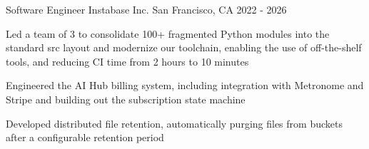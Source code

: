 \begin{cventries}
  \cventry
    {Software Engineer} %
    {Instabase Inc.} %
    {San Francisco, CA} %
    {2022 - 2026} %
    {
      \begin{cvitems} %
        \item {Led a team of 3 to consolidate 100+ fragmented Python modules into the standard src layout and modernize our toolchain, enabling the use of off-the-shelf tools, and reducing CI time from 2 hours to 10 minutes}
        \item {Engineered the AI Hub billing system, including integration with Metronome and Stripe and building out the subscription state machine}
        \item {Developed distributed file retention, automatically purging files from buckets after a configurable retention period}
      \end{cvitems}
    }


\end{cventries}
